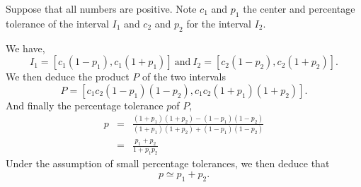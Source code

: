 \documentclass[a4paper,12pt]{article}
\begin{document}
Suppose that all numbers are positive.  Note $c_1$ and $p_1$ the
center and percentage tolerance of the interval $I_1$ and $c_2$ and
$p_2$ for the interval $I_2$.

We have,
\[ I_1 = [c_1(1-p_1), c_1(1+p_1)]\ \mbox{and}\ 
I_2 = [c_2(1-p_2), c_2(1+p_2)].\]
We then deduce the product $P$ of the two intervals
\[ P = [c_1c_2(1-p_1)(1-p_2), c_1c_2(1+p_1)(1+p_2)].\]
And finally the percentage tolerance $p$of $P$,
\begin{eqnarray*}
p &=& \frac{(1+p_1)(1+p_2) - (1-p_1)(1-p_2)}
{(1+p_1)(1+p_2) + (1-p_1)(1-p_2)} \\
&=& \frac{p_1+p_2}{1+p_1p_2}
\end{eqnarray*}
Under the assumption of small percentage tolerances, we then deduce
that
\[ p \simeq p_1 + p_2.\]
\end{document}
